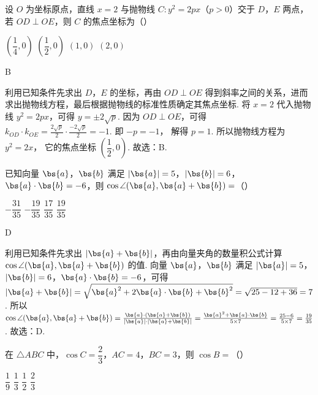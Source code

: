 \begin{problem}
设 \(O\) 为坐标原点，直线 \(x=2\) 与抛物线 \(C:y^2=2px\)（\(p>0\)）交于 \(D\)，\(E\) 两点，若 \(OD\perp OE\)，则 \(C\) 的焦点坐标为（\quad）

\choices
    {\(\left( \dfrac{1}{4},0 \right)\)}
    {\(\left( \dfrac{1}{2},0 \right)\)}
    {\((1,0)\)}
    {\((2,0)\)}
\end{problem}

\begin{answer}
B
\end{answer}

\begin{solution}
利用已知条件先求出 \(D\)，\(E\) 的坐标，再由 \(OD\perp OE\) 得到斜率之间的关系，进而求出抛物线方程，最后根据抛物线的标准性质确定其焦点坐标.
将 \(x=2\) 代入抛物线 \(y^2=2px\)，可得
\(y=\pm2\sqrt{p}\).
因为 \(OD\perp OE\)，可得
\(k_{OD}\cdot k_{OE}=\frac{2\sqrt{p}}{2}\cdot\frac{-2\sqrt{p}}{2}=-1\).
即
\(-p=-1\)，
解得 \(p=1\).
所以抛物线方程为
\(y^2=2x\)，
它的焦点坐标 \(\left( \dfrac{1}{2},0 \right)\).
故选：B.
\end{solution}

\begin{problem}
已知向量 \(\bs{a}\)，\(\bs{b}\) 满足 \(|\bs{a}|=5\)，\(|\bs{b}|=6\)，\(\bs{a}\cdot\bs{b}=-6\)，则 \(\cos\angle(\bs{a},\bs{a}+\bs{b})=\)（\quad）

\choices
    {\(-\dfrac{31}{35}\)}
    {\(-\dfrac{19}{35}\)}
    {\(\dfrac{17}{35}\)}
    {\(\dfrac{19}{35}\)}
\end{problem}

\begin{answer}
D
\end{answer}

\begin{solution}
利用已知条件先求出 \(|\bs{a}+\bs{b}|\)，再由向量夹角的数量积公式计算 \(\cos\angle(\bs{a},\bs{a}+\bs{b})\) 的值.
向量 \(\bs{a}\)，\(\bs{b}\) 满足 \(|\bs{a}|=5\)，\(|\bs{b}|=6\)，\(\bs{a}\cdot\bs{b}=-6\)，可得
\(|\bs{a}+\bs{b}|=\sqrt{\bs{a}^2+2\bs{a}\cdot\bs{b}+\bs{b}^2}=\sqrt{25-12+36}=7\).
所以 \(\cos\angle(\bs{a},\bs{a}+\bs{b})=\frac{\bs{a}\cdot(\bs{a}+\bs{b})}{|\bs{a}|\cdot|\bs{a}+\bs{b}|}=\frac{\bs{a}^2+\bs{a}\cdot\bs{b}}{5\times7}=\frac{25-6}{5\times7}=\frac{19}{35}\).
故选：D.
\end{solution}

\begin{problem}
在 \(\triangle ABC\) 中，\(\cos C=\dfrac{2}{3}\)，\(AC=4\)，\(BC=3\)，则 \(\cos B=\)（\quad）

\choices
    {\(\dfrac{1}{9}\)}
    {\(\dfrac{1}{3}\)}
    {\(\dfrac{1}{2}\)}
    {\(\dfrac{2}{3}\)}
\end{problem}

